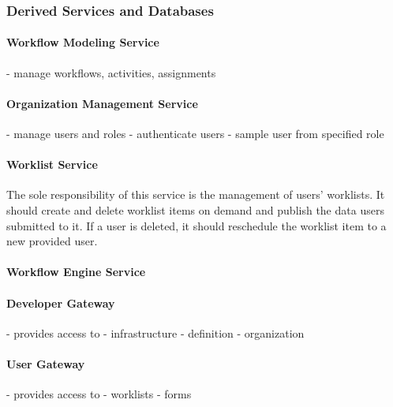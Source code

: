   \subsubsection{Derived Services and Databases} %
  \label{ssub:derived_services}

    \paragraph{Workflow Modeling Service} %
      \label{par:workflow_modeling_service}
      - manage workflows, activities, assignments

    \paragraph{Organization Management Service} %
      \label{par:organization_management_service}
      - manage users and roles
      - authenticate users
      - sample user from specified role

    \paragraph{Worklist Service} %
      \label{par:worklist_service}
      The sole responsibility of this service is the management of users' worklists. It should create and delete worklist items on demand and publish the data users submitted to it. If a user is deleted, it should reschedule the worklist item to a new provided user.

    \paragraph{Workflow Engine Service} %
      \label{par:workflow_engine_service}

    \paragraph{Developer Gateway} %
      \label{par:developer_gateway}
        - provides access to
          - infrastructure
          - definition
          - organization

    \paragraph{User Gateway} %
      \label{par:user_gateway}
        - provides access to
          - worklists
          - forms

